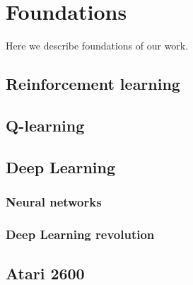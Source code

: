 \chapter{Foundations}
Here we describe foundations of our work.

\section{Reinforcement learning}

\section{Q-learning}

\section{Deep Learning}
\subsection{Neural networks}
\subsection{Deep Learning revolution}

\section{Atari 2600}

